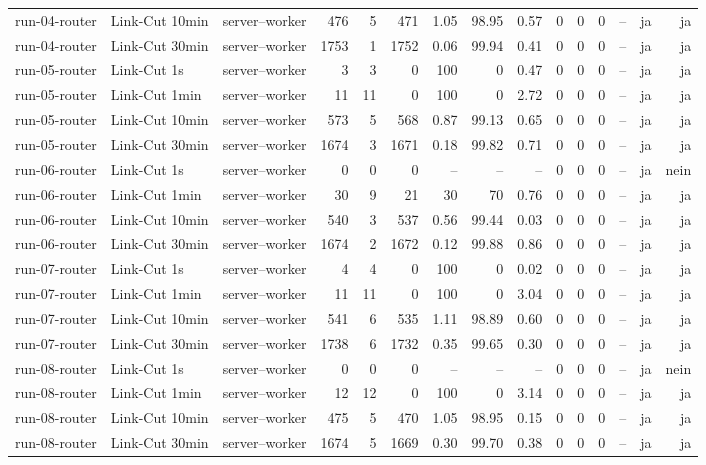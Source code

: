\begin{table}
{\begin{tabular}{l l p{3.2cm} r r r r r r r r r r r r}
run-04-router & Link-Cut 10min & server--worker & 476 & 5 & 471 & 1.05 & 98.95 & 0.57 & 0 & 0 & 0 & -- & ja & ja \\
run-04-router & Link-Cut 30min & server--worker & 1753 & 1 & 1752 & 0.06 & 99.94 & 0.41 & 0 & 0 & 0 & -- & ja & ja \\
run-05-router & Link-Cut 1s & server--worker & 3 & 3 & 0 & 100 & 0 & 0.47 & 0 & 0 & 0 & -- & ja & ja \\
run-05-router & Link-Cut 1min & server--worker & 11 & 11 & 0 & 100 & 0 & 2.72 & 0 & 0 & 0 & -- & ja & ja \\
run-05-router & Link-Cut 10min & server--worker & 573 & 5 & 568 & 0.87 & 99.13 & 0.65 & 0 & 0 & 0 & -- & ja & ja \\
run-05-router & Link-Cut 30min & server--worker & 1674 & 3 & 1671 & 0.18 & 99.82 & 0.71 & 0 & 0 & 0 & -- & ja & ja \\
run-06-router & Link-Cut 1s & server--worker & 0 & 0 & 0 & -- & -- & -- & 0 & 0 & 0 & -- & ja & nein \\
run-06-router & Link-Cut 1min & server--worker & 30 & 9 & 21 & 30 & 70 & 0.76 & 0 & 0 & 0 & -- & ja & ja \\
run-06-router & Link-Cut 10min & server--worker & 540 & 3 & 537 & 0.56 & 99.44 & 0.03 & 0 & 0 & 0 & -- & ja & ja \\
run-06-router & Link-Cut 30min & server--worker & 1674 & 2 & 1672 & 0.12 & 99.88 & 0.86 & 0 & 0 & 0 & -- & ja & ja \\
run-07-router & Link-Cut 1s & server--worker & 4 & 4 & 0 & 100 & 0 & 0.02 & 0 & 0 & 0 & -- & ja & ja \\
run-07-router & Link-Cut 1min & server--worker & 11 & 11 & 0 & 100 & 0 & 3.04 & 0 & 0 & 0 & -- & ja & ja \\
run-07-router & Link-Cut 10min & server--worker & 541 & 6 & 535 & 1.11 & 98.89 & 0.60 & 0 & 0 & 0 & -- & ja & ja \\
run-07-router & Link-Cut 30min & server--worker & 1738 & 6 & 1732 & 0.35 & 99.65 & 0.30 & 0 & 0 & 0 & -- & ja & ja \\
run-08-router & Link-Cut 1s & server--worker & 0 & 0 & 0 & -- & -- & -- & 0 & 0 & 0 & -- & ja & nein \\
run-08-router & Link-Cut 1min & server--worker & 12 & 12 & 0 & 100 & 0 & 3.14 & 0 & 0 & 0 & -- & ja & ja \\
run-08-router & Link-Cut 10min & server--worker & 475 & 5 & 470 & 1.05 & 98.95 & 0.15 & 0 & 0 & 0 & -- & ja & ja \\
run-08-router & Link-Cut 30min & server--worker & 1674 & 5 & 1669 & 0.30 & 99.70 & 0.38 & 0 & 0 & 0 & -- & ja & ja \\

\end{tabular}}
\end{table}

